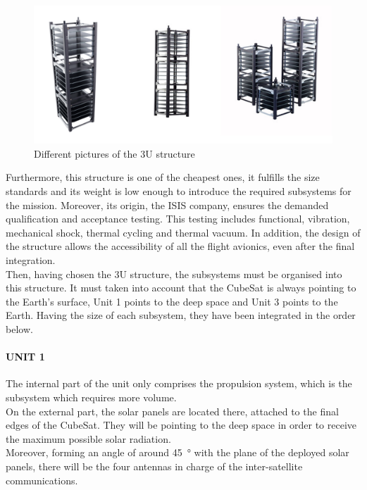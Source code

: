 \begin{figure}[h!]
	\centering
	\includegraphics[width=\textwidth]{img/structures_3u.png}
	\caption{Different pictures of the 3U structure}
	\label{fig:structures_3u}
\end{figure}

Furthermore, this structure is one of the cheapest ones, it fulfills the size
standards and its weight is low enough to introduce the required subsystems for
the mission. Moreover, its origin, the ISIS company, ensures the demanded
qualification and acceptance testing. This testing includes functional, vibration,
mechanical shock, thermal cycling and thermal vacuum. In addition, the design of
the structure allows the accessibility of all the flight avionics, even after
the final integration.\\

Then, having chosen the 3U structure, the subsystems must be organised into this
structure. It must taken into account that the CubeSat is always pointing to the
Earth’s surface, Unit 1 points to the deep space and Unit 3 points to the Earth.
Having the size of each subsystem, they have been integrated in the order below.\\

\paragraph{UNIT 1}
The internal part of the unit only comprises the propulsion system, which is the subsystem which requires more volume.\\
On the external part, the solar panels are located there, attached to the final edges of the CubeSat. They will be pointing to the deep space in order to receive the maximum possible solar radiation.\\
Moreover, forming an angle of around \SI{45}{\degree} with the plane of the
deployed solar panels, there will be the four antennas in charge of the
inter-satellite communications.\\

